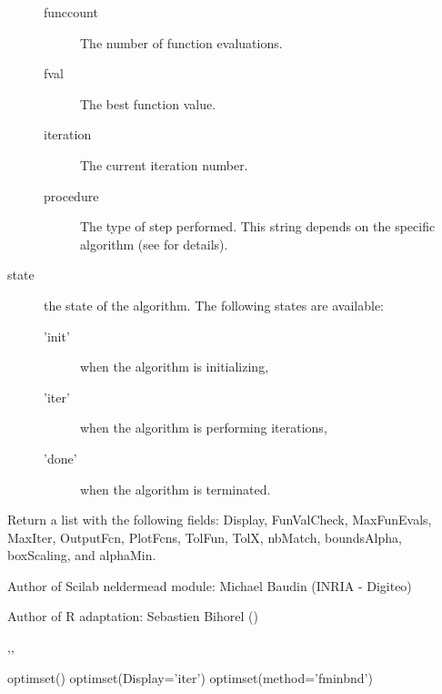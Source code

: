 \begin{Details}
\begin{description}
\begin{description}
\item[funccount] The number of function evaluations.
\item[fval] The best function value.
\item[iteration] The current iteration number.
\item[procedure] The type of step performed. This string depends on the
specific algorithm (see  for details).

\end{description}


\item[state] the state of the algorithm. The following states are
available:\begin{description}

\item['init'] when the algorithm is initializing,
\item['iter'] when the algorithm is performing iterations,
\item['done'] when the algorithm is terminated.

\end{description}



\end{description}

\end{Details}
%
\begin{Value}
Return a list with the following fields: Display, FunValCheck, MaxFunEvals,
MaxIter, OutputFcn, PlotFcns, TolFun, TolX, nbMatch, boundsAlpha, boxScaling, 
and alphaMin.
\end{Value}
%
\begin{Author}\relax
Author of Scilab neldermead module: Michael Baudin (INRIA - Digiteo)

Author of R adaptation: Sebastien Bihorel ()
\end{Author}
%
\begin{SeeAlso}\relax
{},, 
\end{SeeAlso}
%
\begin{Examples}
\begin{ExampleCode}
  optimset()
  optimset(Display='iter')
  optimset(method='fminbnd')
\end{ExampleCode}
\end{Examples}
